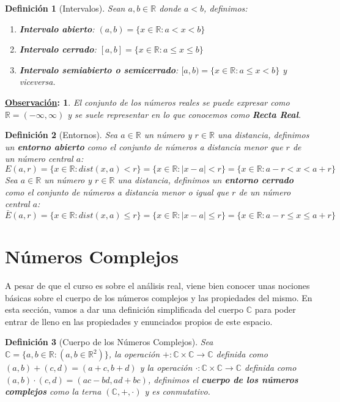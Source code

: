 \documentclass[10pt,a4paper,openright]{book}
\theoremstyle{break}
\newtheorem*{defi}{Definición}
\newtheorem*{obs}{\underline{Observación}:}
\begin{document}
\begin{defi}[Intervalos]
Sean $a,b\in \mathbb R$ donde $a<b$, definimos:
\begin{enumerate}
\item \textbf{Intervalo abierto}: $(a,b)=\{x\in \mathbb R: a<x<b\}$
\item \textbf{Intervalo cerrado}: $[a,b]=\{x\in \mathbb R: a\leq x\leq b\}$
\item \textbf{Intervalo semiabierto o semicerrado}: $[a,b)=\{x\in \mathbb R: a\leq x<b\}$ y viceversa.
\end{enumerate}
\end{defi}

\begin{obs}
El conjunto de los números reales se puede expresar como $\mathbb R=(-\infty,\infty)$ y se suele representar en lo que conocemos como \textbf{Recta Real}.
\end{obs}

\begin{defi}[Entornos]
Sea $a\in \mathbb{R}$ un número y $r\in \mathbb{R}$ una distancia, definimos un \textbf{entorno abierto} como el conjunto de números a distancia menor que $r$ de un número central $a$:
$$E(a,r)=\{x\in \mathbb R : dist(x,a)<r\}=\{x\in \mathbb R :|x-a|<r\}=\{x\in \mathbb R :a-r<x<a+r\}$$
Sea $a\in \mathbb{R}$ un número y $r\in \mathbb{R}$ una distancia, definimos un \textbf{entorno cerrado} como el conjunto de números a distancia menor o igual que $r$ de un número central $a$:
$$\bar{E}(a,r)=\{x\in \mathbb R : dist(x,a)\leq r\}=\{x\in \mathbb R :|x-a|\leq r\}=\{x\in \mathbb R :a-r\leq x\leq a+r\}$$
\end{defi}

\section{Números Complejos}
A pesar de que el curso es sobre el análisis real, viene bien conocer unas nociones básicas sobre el cuerpo de los números complejos y las propiedades del mismo. En esta sección, vamos a dar una definición simplificada del cuerpo $\mathbb{C}$ para poder entrar de lleno en las propiedades y enunciados propios de este espacio.

\begin{defi}[Cuerpo de los Números Complejos]
Sea $\mathbb C=\{a,b\in \mathbb R: (a,b\in \mathbb{R}^2)\}$, la operación $+: \mathbb{C}\times \mathbb{C}\rightarrow \mathbb{C}$ definida como $(a,b) + (c,d) = (a+c, b+d)$ y la operación $\cdot : \mathbb{C}\times \mathbb{C}\rightarrow \mathbb{C}$ definida como $(a,b)\cdot (c,d)=(ac-bd,ad+bc)$, definimos el \textbf{cuerpo de los números complejos} como la terna $(\mathbb{C}, +, \cdot)$ y es conmutativo.
\end{defi}
\end{document}
